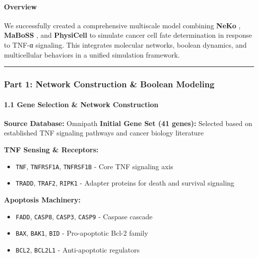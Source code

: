 \hypertarget{overview}{%
\paragraph{Overview}\label{overview}}

We successfully created a comprehensive multiscale model combining
\textbf{NeKo} , \textbf{MaBoSS} , and \textbf{PhysiCell} to simulate
cancer cell fate determination in response to TNF-α signaling. This
integrates molecular networks, boolean dynamics, and multicellular
behaviors in a unified simulation framework.

\begin{center}\rule{0.5\linewidth}{0.5pt}\end{center}

\hypertarget{part-1-network-construction-boolean-modeling}{%
\subsubsection{Part 1: Network Construction \& Boolean
Modeling}\label{part-1-network-construction-boolean-modeling}}

\hypertarget{gene-selection-network-construction}{%
\paragraph{1.1 Gene Selection \& Network
Construction}\label{gene-selection-network-construction}}

\textbf{Source Database:} Omnipath \textbf{Initial Gene Set (41 genes):}
Selected based on established TNF signaling pathways and cancer biology
literature

\textbf{TNF Sensing \& Receptors:}

\begin{itemize}
\tightlist
\item
  \texttt{TNF}, \texttt{TNFRSF1A}, \texttt{TNFRSF1B} - Core TNF
  signaling axis
\item
  \texttt{TRADD}, \texttt{TRAF2}, \texttt{RIPK1} - Adapter proteins for
  death and survival signaling
\end{itemize}

\textbf{Apoptosis Machinery:}

\begin{itemize}
\tightlist
\item
  \texttt{FADD}, \texttt{CASP8}, \texttt{CASP3}, \texttt{CASP9} -
  Caspase cascade
\item
  \texttt{BAX}, \texttt{BAK1}, \texttt{BID} - Pro-apoptotic Bcl-2 family
\item
  \texttt{BCL2}, \texttt{BCL2L1} - Anti-apoptotic regulators
\end{itemize}


